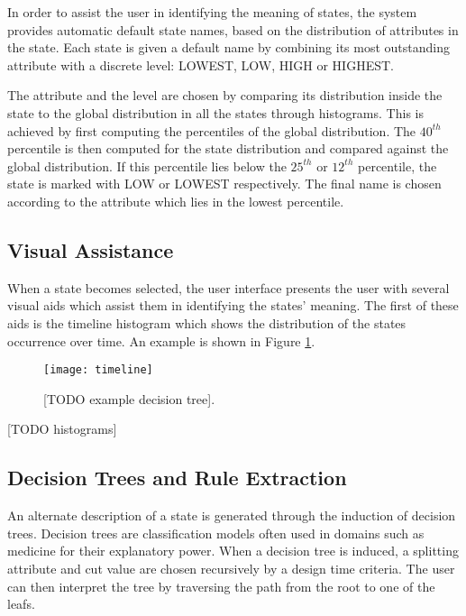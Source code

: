 In order to assist the user in identifying the meaning of states, the system provides automatic default
state names, based on the distribution of attributes in the state. Each state is given a default name
by combining its most outstanding attribute with a discrete level: LOWEST, LOW, HIGH or
HIGHEST.

The attribute and the level are chosen by comparing its distribution inside the state to the global
distribution in all the states through histograms. This is achieved by first computing the percentiles
of the global distribution. The $40^{th}$ percentile is then computed for the state distribution and
compared against the global distribution. If this percentile lies below the $25^{th}$ or $12^{th}$
percentile, the state is marked with LOW or LOWEST respectively. The final name is chosen according
to the attribute which lies in the lowest percentile.

\subsection{Visual Assistance}

When a state becomes selected, the user interface presents the user with several visual aids which
assist them in identifying the states' meaning. The first of these aids is the timeline histogram
which shows the distribution of the states occurrence over time. An example is shown in Figure 
\ref{fig:time-hist}.

\begin{figure}[h!]
	\centering
	\texttt{[image: timeline]}
	\caption{[TODO example decision tree].}
	\label{fig:time-hist}
\end{figure}

[TODO histograms]




\subsection{Decision Trees and Rule Extraction}

An alternate description of a state is generated through the induction of decision trees. Decision
trees are classification models often used in domains such as medicine for their explanatory power.
When a decision tree is induced, a splitting attribute and cut value are chosen recursively by a
design time criteria. The user can then interpret the tree by traversing the path from the root 
to one of the leafs.

